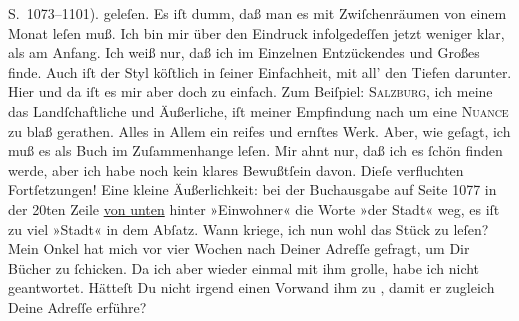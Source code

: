 \begin{ledgroupsized}[t]{13cm}
{{{                  S. 1073–1101).}}}\label{K_L02620-2h} geleſen. Es iſt dumm, daß man es mit
               Zwiſchenräumen  von einem Monat leſen muß. Ich bin
               mir über den Eindruck infolgedeſſen jetzt weniger {\pb}klar, als am Anfang. Ich weiß nur, daß ich im Einzelnen Entzückendes und Großes
               finde. Auch iſt der Styl köſtlich in ſeiner Einfachheit, mit all’ den Tiefen
               darunter.  Hier und da iſt es mir aber doch zu einfach. Zum Beiſpiel:
                  \textsc{Salzburg}, ich meine das
               Landſchaftliche und Äußerliche, iſt meiner Empfindung nach um eine \textsc{Nuance} zu blaß gerathen. Alles in Allem ein reifes und
               ernſtes Werk. Aber, wie geſagt, ich muß es als Buch im Zuſammenhange leſen. Mir ahnt
               nur, daß ich es ſchön finden werde, {\pb}aber ich habe
               noch kein klares Bewußtſein davon. Dieſe verfluchten Fortſetzungen! Eine kleine
               Äußerlichkeit: bei der Buchausgabe \label{K_mets_Goldmann_94-partII-5v}\label{K_mets_Goldmann_94-partII-5h} auf
               Seite 1077 in der 20ten Zeile \uline{von unten} hinter
               »Einwohner« die Worte »der Stadt« weg, es iſt zu viel »Stadt« in dem Abſatz.\pend
           \pstart
           Wann kriege, ich nun wohl das Stück zu leſen?\pend
           \pstart
           Mein \strikeout{\textcolor{gray}{Onk}}{ }Onkel hat mich
               vor vier Wochen nach Deiner Adreſſe gefragt, um Dir Bücher zu ſchicken. Da ich aber
               wieder einmal mit ihm grolle, habe ich nicht geantwortet. Hätteſt Du nicht irgend
               einen Vorwand ihm zu \label{K_mets_Goldmann_94-partII-44v}\label{K_mets_Goldmann_94-partII-44h}{ }, damit er zugleich {\pb}Deine Adreſſe erführe?\pend

\end{ledgroupsized}
